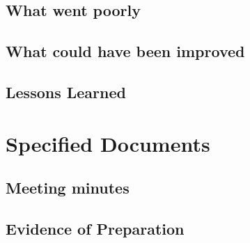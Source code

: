 \documentclass[a4paper]{report}
\begin{document}
\section{What went poorly}
\section{What could have been improved}
\section{Lessons Learned}

\chapter{Specified Documents}
\section{Meeting minutes}
\section{Evidence of Preparation}
\end{document}
